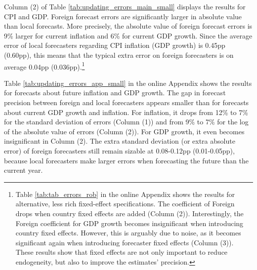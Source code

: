 Column (2) of Table \ref{tab:updating_errors_main_small} displays the results for CPI and GDP. Foreign forecast errors are significantly larger in absolute value than local forecasts. More precisely, the absolute value of foreign forecast errors is 9\% larger for current inflation and 6\% for current GDP growth. Since the average error of local forecasters regarding CPI inflation (GDP growth) is 0.45pp (0.60pp), this means that the typical extra error on foreign forecasters is on average 0.04pp (0.036pp).\footnote{Table \ref{tab:tab_errors_rob} in the online Appendix shows the results for alternative, less rich fixed-effect specifications. The coefficient of Foreign drops when country fixed effects are added (Column (2)). Interestingly, the Foreign coefficient for GDP growth becomes insignificant when introducing country fixed effects. However, this is arguably due to noise, as it becomes significant again when introducing forecaster fixed effects (Column (3)). These results show that fixed effects are not only important to reduce endogeneity, but also to improve the estimates' precision.} %


Table \ref{tab:updating_errors_app_small} in the online Appendix shows the results for forecasts about future inflation and GDP growth. The gap in forecast precision between foreign and local forecasters appears smaller than for forecasts about current GDP growth and inflation. For inflation, it drops from 12\% to 7\% for the standard deviation of errors (Column (1)) and from 9\% to 7\% for the log of the absolute value of errors (Column (2)). For GDP growth, it even becomes insignificant in Column (2). The extra standard deviation (or extra absolute error) of foreign forecasters still remain sizable at 0.08-0.12pp (0.01-0.05pp), because local forecasters make larger errors when forecasting the future than the current year.
